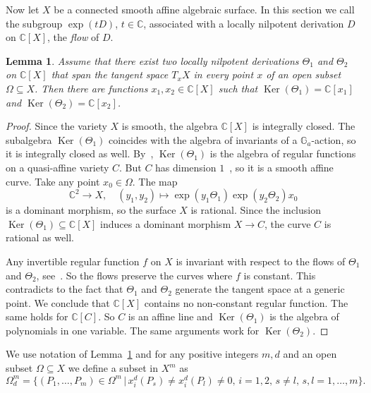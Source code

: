 \documentclass[a4paper,draft,reqno,12pt]{amsart}
\newtheorem{lemma}[theorem]{Lemma}
\theoremstyle{definition}
\theoremstyle{remark}
\DeclareMathOperator{\Ker}{Ker}
\def\GG{{\mathbb G}}
\def\CC{{\mathbb C}}
\begin{document}
Now let $X$ be a connected smooth affine algebraic surface. In this section we call the subgroup $\exp(tD)$, $t\in\CC$, associated with a locally nilpotent derivation $D$ on $\CC[X]$, the \emph{flow}
 of $D$.
 
\begin{lemma} \label{pol}
Assume that there exist two locally nilpotent derivations $\Theta_1$ and $\Theta_2$ on $\CC[X]$ 
that span the tangent space $T_xX$ in every point $x$ of an open subset $\Omega\subseteq X$.
Then there are functions $x_1,x_2\in\CC[X]$ such that $\Ker(\Theta_1)=\CC[x_1]$ and 
$\Ker(\Theta_2)=\CC[x_2]$. 
\end{lemma}

\begin{proof}
Since the variety $X$ is smooth, the algebra $\CC[X]$ is integrally closed. The subalgebra $\Ker(\Theta_1)$ coincides with the algebra of invariants of a $\GG_a$-action, so it is 
integrally closed as well. By~\cite[Theorem~1]{Win}, $\Ker(\Theta_1)$ is the algebra of regular functions on a quasi-affine variety $C$. But $C$ has dimension $1$~\cite[Principle~11(e)]{Fr}, so it is a smooth affine curve. Take any point $x_0\in\Omega$. The map
$$
\CC^2\to X, \quad (y_1,y_2)\mapsto \exp(y_1\Theta_1)\exp(y_2\Theta_2) x_0
$$
is a dominant morphism, so the surface $X$ is rational. Since the inclusion ${\Ker(\Theta_1)\subseteq\CC[X]}$ induces a dominant morphism $X\to C$, the curve $C$ is rational as well. 

Any invertible regular function $f$ on $X$ is invariant with respect to the flows of $\Theta_1$ and $\Theta_2$, see~\cite[Principle~1(b)]{Fr}. So the flows preserve the curves where $f$ is constant. This contradicts to the fact that
$\Theta_1$ and $\Theta_2$ generate the tangent space at a generic point. We conclude that $\CC[X]$ contains no non-constant regular function. The same holds for $\CC[C]$. So $C$ is an affine line and $\Ker(\Theta_1)$ is the algebra of polynomials in one variable. The same arguments work for $\Ker(\Theta_2)$.
\end{proof} 

We use notation of Lemma~\ref{pol} and for any positive integers $m, d$ and an open subset $\Omega\subseteq X$ we define a subset in $X^m$ as
$$
\Omega^m_d=\{(P_1,\ldots,P_m)\in \Omega^m \, | \, x_i^d(P_s)\ne x_i^d(P_l)\ne 0,\, i=1,2,\, s\ne l,\,  s,l=1,\ldots, m\}.
$$
\end{document}
